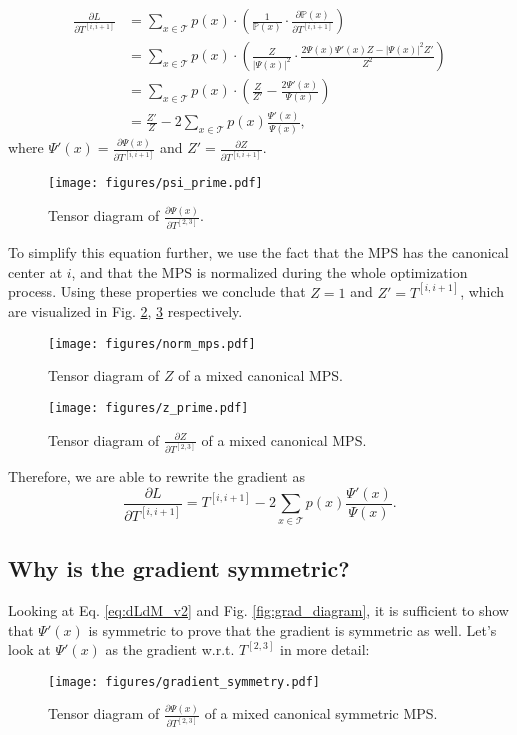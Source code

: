 \begin{align*}
    \frac{\partial L}{\partial T^{[i,i+1]}}  &= \sum_{x\in\mathcal T}p(x) \cdot\left(
    \frac{1}{\mathbb{P}(x)}\cdot\frac{\partial \mathbb{P}(x)}{\partial T^{[i,i+1]}}
    \right) \\
    &= \sum_{x\in\mathcal T}p(x)\cdot\left(\frac{Z}{\left|\Psi(x)\right|^2}\cdot\frac{2\Psi(x)\Psi'(x)Z-\left|\Psi(x)\right|^2 Z'}{Z^2}\right) \\
    &= \sum_{x\in\mathcal T}p(x)\cdot\left(\frac{Z}{Z'}-\frac{2\Psi'(x)}{\Psi(x)}\right) \\
    &= \frac{Z'}{Z} - 2\sum_{x\in\mathcal T}p(x)\frac{\Psi'(x)}{\Psi(x)},
\end{align*}
where $\Psi'(x)=\frac{\partial \Psi(x)}{\partial T^{[i,i+1]}}$ and $Z'=\frac{\partial Z}{\partial T^{[i,i+1]}}$.

\begin{figure}[ht]
    \centering
    \texttt{[image: figures/psi\_prime.pdf]}
    \caption{Tensor diagram of $\frac{\partial\Psi(x)}{\partial T^{[2,3]}}$.}
    \label{fig:psi_prime}
\end{figure}

To simplify this equation further, we use the fact that the MPS has the canonical center at $i$, and that the MPS is normalized during the whole optimization process. Using these properties we conclude that $Z=1$ and $Z'=T^{[i,i+1]}$, which are visualized in Fig. \ref{fig:norm_mps}, \ref{fig:z_prime} respectively. 
\begin{figure}[ht]
    \centering
    \texttt{[image: figures/norm\_mps.pdf]}
    \caption{Tensor diagram of $Z$ of a mixed canonical MPS.}
    \label{fig:norm_mps}
\end{figure}
\begin{figure}[ht]
    \centering
    \texttt{[image: figures/z\_prime.pdf]}
    \caption{Tensor diagram of $\frac{\partial Z}{\partial T^{[2,3]}}$ of a mixed canonical MPS.}
    \label{fig:z_prime}
\end{figure}

Therefore, we are able to rewrite the gradient as
\begin{equation}\label{eq:dLdM_v2}
    \frac{\partial L}{\partial T^{[i,i+1]}} = T^{[i,i+1]} - 2\sum_{x\in\mathcal T}p(x)\frac{\Psi'(x)}{\Psi(x)}.
\end{equation}

\subsection{Why is the gradient symmetric?}
\label{appendix:gradient_symmetry}
Looking at Eq. \eqref{eq:dLdM_v2} and Fig. \ref{fig:grad_diagram}, it is sufficient to show that $\Psi'(x)$ is symmetric to prove that the gradient is symmetric as well.
Let's look at $\Psi'(x)$ as the gradient w.r.t. $T^{[2,3]}$ in more detail:
\begin{figure}[ht]
    \centering
    \texttt{[image: figures/gradient\_symmetry.pdf]}
    \caption{Tensor diagram of $\frac{\partial \Psi(x)}{\partial T^{[2,3]}}$ of a mixed canonical symmetric MPS.}
    \label{fig:psi_prime_sym}
\end{figure}

